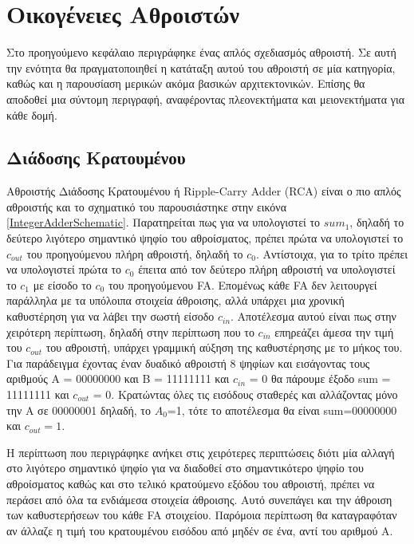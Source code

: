 \section{Οικογένειες Αθροιστών}
Στο προηγούμενο κεφάλαιο περιγράφηκε ένας απλός σχεδιασμός αθροιστή. Σε αυτή την ενότητα θα πραγματοποιηθεί η κατάταξη αυτού του αθροιστή σε μία κατηγορία, καθώς και η παρουσίαση μερικών ακόμα βασικών αρχιτεκτονικών. Επίσης θα αποδοθεί μια σύντομη περιγραφή, αναφέροντας πλεονεκτήματα και μειονεκτήματα για κάθε δομή. 



\subsection{Διάδοσης Κρατουμένου}
Αθροιστής Διάδοσης Κρατουμένου ή Ripple-Carry Adder (RCA) είναι ο πιο απλός αθροιστής και το σχηματικό του παρουσιάστηκε στην εικόνα \ref{IntegerAdderSchematic}. Παρατηρείται πως για να υπολογιστεί το $sum_1$, δηλαδή το δεύτερο λιγότερο σημαντικό ψηφίο του αθροίσματος, πρέπει πρώτα να υπολογιστεί το $c_{out}$ του προηγούμενου πλήρη αθροιστή, δηλαδή το $c_0$. Αντίστοιχα, για το τρίτο πρέπει να υπολογιστεί πρώτα το $c_0$ έπειτα από τον δεύτερο πλήρη αθροιστή να υπολογιστεί το $c_1$ με είσοδο το $c_0$ του προηγούμενου FA. Επομένως κάθε FA δεν λειτουργεί παράλληλα με τα υπόλοιπα στοιχεία άθροισης, αλλά υπάρχει μια χρονική καθυστέρηση για να λάβει την σωστή είσοδο $c_{in}$. Αποτέλεσμα αυτού είναι πως στην χειρότερη περίπτωση, δηλαδή στην περίπτωση που το $c_{in}$ επηρεάζει άμεσα την τιμή του $c_{out}$ του αθροιστή, υπάρχει γραμμική αύξηση της καθυστέρησης με το μήκος του.
Για παράδειγμα έχοντας έναν δυαδικό αθροιστή 8 ψηφίων και εισάγοντας τους αριθμούς Α = 00000000 και Β = 11111111 και $c_{in}$ = 0 θα πάρουμε έξοδο sum = 11111111 και $c_{out}$ = 0. Κρατώντας όλες τις εισόδους σταθερές και αλλάζοντας μόνο την Α σε 00000001 δηλαδή, το $A_0$=1, τότε το αποτέλεσμα θα είναι sum=00000000 και $c_{out}=1$. 

Η περίπτωση που περιγράφηκε ανήκει στις χειρότερες περιπτώσεις διότι μία αλλαγή στο λιγότερο σημαντικό ψηφίο για να διαδοθεί στο σημαντικότερο ψηφίο του αθροίσματος καθώς και στο τελικό κρατούμενο εξόδου του αθροιστή, πρέπει να περάσει από όλα τα ενδιάμεσα στοιχεία άθροισης. Αυτό συνεπάγει και την άθροιση των καθυστερήσεων του κάθε FA στοιχείου. Παρόμοια περίπτωση θα καταγραφόταν αν άλλαζε η τιμή του κρατουμένου εισόδου από μηδέν σε ένα, αντί του αριθμού A.


